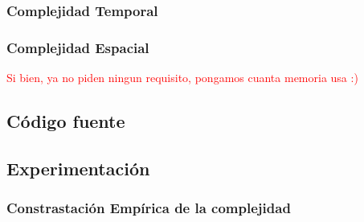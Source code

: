 \subsubsection{Complejidad Temporal}
\subsubsection{Complejidad Espacial}
\textcolor{red}{Si bien, ya no piden ningun requisito, pongamos cuanta memoria usa :)}
\subsection{C\'odigo fuente}
\subsection{Experimentaci\'on}

\subsubsection{Constrastaci\'on Emp\'irica de la complejidad}
